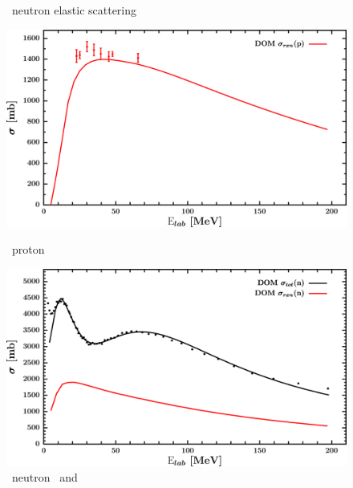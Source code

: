 \begin{figure}[hbtp]
\begin{minipage}{0.47\textwidth}
        \caption*{\snTwelve\ neutron elastic scattering}
        \label{DOMFitData_sn112_neutron_elastic}
    \end{minipage}
\end{figure}
\vspace{0.70in}
\begin{figure}[hbtp]
    \centering
    \begin{minipage}{0.47\textwidth}
        \centering
        \includegraphics[width=\linewidth]{figures/sn112_protonInelastic.png}
        \caption*{\snTwelve\ proton \rxn}
        \label{DOMFitData_sn112_proton_inelastic}
    \end{minipage}\hspace{6pt}
    \begin{minipage}{0.47\textwidth}
        \centering
        \includegraphics[width=\textwidth]{figures/sn112_neutronInelastic.png}
        \caption*{\snTwelve\ neutron \rxn\ and \tot}
        \label{DOMFitData_sn112_neutron_inelastic}
    \end{minipage}
\end{figure}
